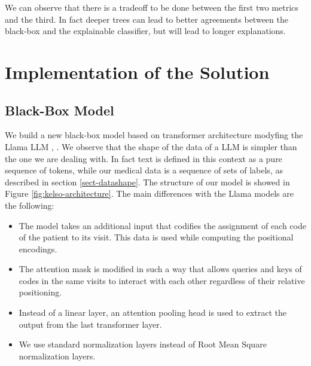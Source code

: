 \documentclass[]{marticle}
\begin{document}
We can observe that there is a tradeoff to be done between the first two metrics and the third. In
fact deeper trees can lead to better agreements between the black-box and the explainable
classifier, but will lead to longer explanations.

\section{Implementation of the Solution}

\subsection{Black-Box Model} \label{sect-kelso}

We build a new black-box model based on transformer architecture modyfing the Llama LLM
\cite{llama}, \cite{llama-2}. We observe that the shape of the data of a LLM is simpler than the one
we are dealing with. In fact text is defined in this context as a pure sequence of tokens, while our
medical data is a sequence of sets of labels, as described in section \ref{sect-datashape}.
The structure of our model is showed in Figure \ref{fig:kelso-architecture}. The main differences
with the Llama models are the following:
\begin{itemize}
\item The model takes an additional input that codifies the assignment of each code of the patient
    to its visit. This data is used while computing the positional encodings.

\item The attention mask is modified in such a way that allows queries and keys of codes in the same
    visits to interact with each other regardless of their relative positioning.

\item Instead of a linear layer, an attention pooling head is used to extract the output from the
    last transformer layer.

\item We use standard normalization layers instead of Root Mean Square normalization layers.
\end{itemize}
\end{document}
